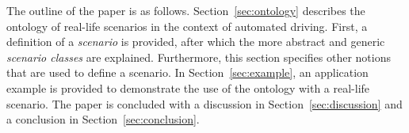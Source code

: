 The outline of the paper is as follows. Section~\ref{sec:ontology} describes the ontology of real-life scenarios in the context of automated driving. First, a definition of a \emph{scenario} is provided, after which the more abstract and generic \emph{scenario classes} are explained. Furthermore, this section specifies other notions that are used to define a scenario. In Section~\ref{sec:example}, an application example is provided to demonstrate the use of the ontology with a real-life scenario. The paper is concluded with a discussion in Section~\ref{sec:discussion} and a conclusion in Section~\ref{sec:conclusion}.
